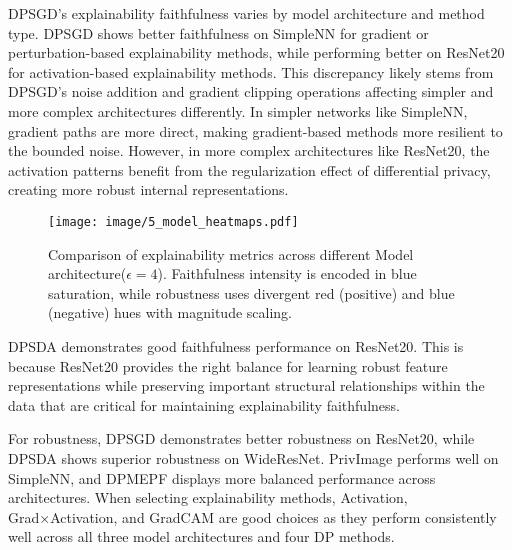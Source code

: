 \documentclass{article}
\begin{document}
DPSGD's explainability faithfulness varies by model architecture and method type. DPSGD shows better faithfulness on SimpleNN for gradient or perturbation-based explainability methods, while performing better on ResNet20 for activation-based explainability methods. This discrepancy likely stems from DPSGD's noise addition and gradient clipping operations affecting simpler and more complex architectures differently. In simpler networks like SimpleNN, gradient paths are more direct, making gradient-based methods more resilient to the bounded noise. However, in more complex architectures like ResNet20, the activation patterns benefit from the regularization effect of differential privacy, creating more robust internal representations.

\begin{figure*}[!t]
\centering
\texttt{[image: image/5\_model\_heatmaps.pdf]}
\caption{Comparison of explainability metrics across different Model architecture($\epsilon=4$). Faithfulness intensity is encoded in blue saturation, while robustness uses divergent red (positive) and blue (negative) hues with magnitude scaling.}
\label{fig:architectures}
\end{figure*}

DPSDA demonstrates good faithfulness performance on ResNet20. This is because ResNet20 provides the right balance for learning robust feature representations while preserving important structural relationships within the data that are critical for maintaining explainability faithfulness.

For robustness, DPSGD demonstrates better robustness on ResNet20, while DPSDA shows superior robustness on WideResNet. PrivImage performs well on SimpleNN, and DPMEPF displays more balanced performance across architectures. When selecting explainability methods, Activation, Grad×Activation, and GradCAM are good choices as they perform consistently well across all three model architectures and four DP methods.
\end{document}
